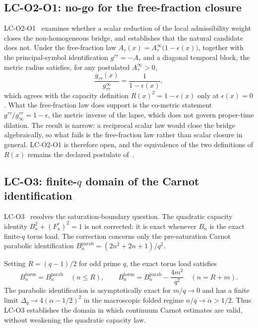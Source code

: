 \documentclass[12pt,a4paper]{article}
\theoremstyle{remark}
\begin{document}
  \subsection{LC-O2-O1: no-go for the free-fraction closure~\texorpdfstring{\cite{Beau2026lco2o1}}{}}
    \label{subsec:lco2o1}

    LC-O2-O1~\cite{Beau2026lco2o1} examines whether a scalar reduction of the local
    admissibility weight closes the non-homogeneous bridge, and establishes that the natural
    candidate does not.
    Under the free-fraction law $A_\tau(x) = A_\tau^\infty\bigl(1-\epsilon(x)\bigr)$, together with
    the principal-symbol identification $g^{\tau\tau} = -A_\tau$ and a diagonal temporal block, the metric
    radius satisfies, for any postulated $A_\tau^\infty > 0$,
    \[
      \frac{g_{\tau\tau}(x)}{g_{\tau\tau}^{\infty}} = \frac{1}{1-\epsilon(x)},
    \]
    which agrees with the capacity definition $R(x)^2 = 1-\epsilon(x)$ only at $\epsilon(x) = 0$.
    What the free-fraction law does support is the co-metric statement
    $g^{\tau\tau}/g^{\tau\tau}_\infty = 1-\epsilon$, the metric inverse of the lapse, which does
    not govern proper-time dilation.
    The result is narrow: a reciprocal scalar law would close the bridge algebraically, so what
    fails is the free-fraction law rather than scalar closure in general.
    LC-O2-O1 is therefore open, and the equivalence of the two definitions of $R(x)$ remains
    the declared postulate of~\cite{Beau2026lco2}.

  \subsection{LC-O3: finite-$q$ domain of the Carnot identification~\texorpdfstring{\cite{Beau2026lco3}}{}}
    \label{subsec:lco3}

    LC-O3~\cite{Beau2026lco3} resolves the saturation-boundary question.
    The quadratic capacity identity $B_n^2 + (F_n^\tau)^2 = 1$ is not corrected: it is exact
    whenever $B_n$ is the exact finite-$q$ torus load.
    The correction concerns only the pre-saturation Carnot parabolic identification
    $B_n^{\mathrm{parab}} = (2n^2+2n+1)/q^2$.

    Setting $R = (q-1)/2$ for odd prime $q$, the exact torus load satisfies
    \[
      B_n^{\mathrm{torus}} = B_n^{\mathrm{parab}} \quad (n \leq R),
      \qquad
      B_n^{\mathrm{torus}} = B_n^{\mathrm{parab}} - \frac{4m^2}{q^2} \quad (n = R+m).
    \]
    The parabolic identification is asymptotically exact for $m/q \to 0$ and has a finite
    limit $\Delta_q \to 4(\alpha - 1/2)^2$ in the macroscopic folded regime $n/q \to \alpha >
  1/2$.
    Thus LC-O3 establishes the domain in which continuum Carnot estimates are valid, without
    weakening the quadratic capacity law.
\end{document}

